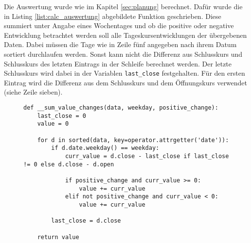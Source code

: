 Die Auswertung wurde wie im Kapitel \cref{sec:planung} berechnet. Dafür wurde die in Listing \ref{list:calc_auswertung} abgebildete Funktion geschrieben. Diese summiert unter Angabe eines Wochentages und ob die positive oder negative Entwicklung betrachtet werden soll alle Tageskursentwicklungen der übergebenen Daten. Dabei müssen die Tage wie in Zeile fünf angegeben nach ihrem Datum sortiert durchlaufen werden. Sonst kann nicht die Differenz aus Schlusskurs und Schlusskurs des letzten Eintrags in der Schleife berechnet werden. Der letzte Schlusskurs wird dabei in der Variablen \texttt{last\_close} festgehalten. Für den ersten Eintrag wird die Differenz aus dem Schlusskurs und dem Öffnungskurs verwendet (siehe Zeile sieben).

\begin{figure}[!htb]
    \begin{lstlisting}[caption=Berechnung der Kursentwicklung nach Wochentag, label=list:calc_auswertung]
def __sum_value_changes(data, weekday, positive_change):
    last_close = 0
    value = 0

    for d in sorted(data, key=operator.attrgetter('date')):
        if d.date.weekday() == weekday:
            curr_value = d.close - last_close if last_close != 0 else d.close - d.open

            if positive_change and curr_value >= 0:
                value += curr_value
            elif not positive_change and curr_value < 0:
                value += curr_value

        last_close = d.close

    return value
    \end{lstlisting}
\end{figure}


